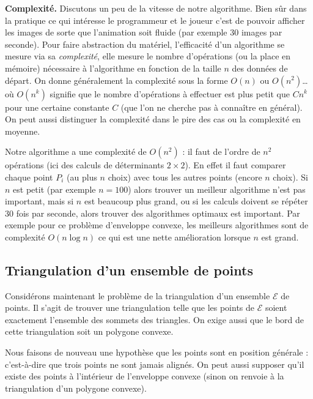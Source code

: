 \documentclass[11pt,class=report,crop=false]{standalone}
\begin{document}

\bigskip

\textbf{Complexité.}
Discutons un peu de la vitesse de notre algorithme.
Bien sûr dans la pratique ce qui intéresse le programmeur et le joueur c'est de pouvoir afficher les images de sorte que l'animation soit fluide (par exemple 30 images par seconde).
Pour faire abstraction du matériel, l'efficacité d'un algorithme se mesure via sa \emph{complexité}, elle mesure le nombre d'opérations (ou la place en mémoire) nécessaire à l'algorithme en fonction de la taille $n$ des données de départ. On donne généralement la complexité sous la forme $O(n)$ ou $O(n^2)$\ldots où $O(n^k)$ signifie que le nombre d'opérations à effectuer est plus petit que $C n^k$ pour une certaine constante $C$ (que l'on ne cherche pas à connaître en général). On peut aussi distinguer la complexité dans le pire des cas ou la complexité en moyenne.

Notre algorithme a une complexité de $O(n^2)$ : il faut de l'ordre de $n^2$ opérations (ici des calculs de déterminants $2\times 2$).
En effet il faut comparer chaque point $P_i$ (au plus $n$ choix) avec tous les autres points (encore $n$ choix).
Si $n$ est petit (par exemple $n=100$) alors trouver un meilleur algorithme n'est pas important, mais si $n$ est beaucoup plus grand, ou si les calculs doivent se répéter 30 fois par seconde, alors trouver des algorithmes optimaux est important.
Par exemple pour ce problème d'enveloppe convexe, les meilleurs algorithmes sont de complexité $O(n\log n)$ ce qui est une nette amélioration lorsque $n$ est grand.


\subsection{Triangulation d'un ensemble de points}

Considérons maintenant le problème de la triangulation d'un ensemble $\mathcal{E}$ de points.
Il s'agit de trouver une triangulation telle que les points de $\mathcal{E}$ soient exactement l'ensemble des sommets des triangles. On exige aussi que le bord de cette triangulation soit un polygone convexe.




Nous faisons de nouveau une hypothèse que les points sont en position générale : c'est-à-dire que trois points ne sont jamais alignés.
On peut aussi supposer qu'il existe des points à l'intérieur de l'enveloppe convexe (sinon on renvoie à la triangulation d'un polygone convexe).
\end{document}
